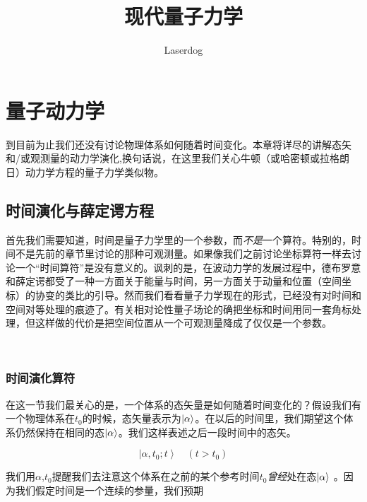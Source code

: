 \documentclass[UTF8,twoside]{ctexart}
\begin{document}
\setcounter{section}{1}
\title{现代量子力学}
\author{Laserdog}

\maketitle
\thispagestyle{empty}

\cleardoublepage
{}
\tableofcontents
\clearpage
\section{量子动力学}
\noindent 到目前为止我们还没有讨论物理体系如何随着时间变化。本章将详尽的讲解态矢和/或观测量的动力学演化,换句话说，在这里我们关心牛顿（或哈密顿或拉格朗日）动力学方程的量子力学类似物。

\subsection{时间演化与薛定谔方程}



\noindent 首先我们需要知道，时间是量子力学里的一个参数，而{\it 不是}一个算符。特别的，时间不是先前的章节里讨论的那种可观测量。如果像我们之前讨论坐标算符一样去讨论一个“时间算符”是没有意义的。讽刺的是，在波动力学的发展过程中，德布罗意和薛定谔都受了一种一方面关于能量与时间，另一方面关于动量和位置（空间坐标）的协变的类比的引导。然而我们看看量子力学现在的形式，已经没有对时间和空间对等处理的痕迹了。有关相对论性量子场论的确把坐标和时间用同一套角标处理，但这样做的代价是把空间位置从一个可观测量降成了仅仅是一个参数。

\ 

\subsubsection{时间演化算符}


\noindent 在这一节我们最关心的是，一个体系的态矢量是如何随着时间变化的？假设我们有一个物理体系在$t_0$的时候，态矢量表示为$\ket{\alpha}$。在以后的时间里，我们期望这个体系仍然保持在相同的态$\ket{\alpha}$。我们这样表述之后一段时间中的态矢。

\begin{equation}
\left|\alpha, t_0; t\right\rangle\quad(t>t_0)
\end{equation}

\noindent 我们用$\alpha$,$t_0$提醒我们去注意这个体系在之前的某个参考时间$t_0${\it 曾经}处在态$\ket{\alpha}$ 。因为我们假定时间是一个连续的参量，我们预期
\end{document}
